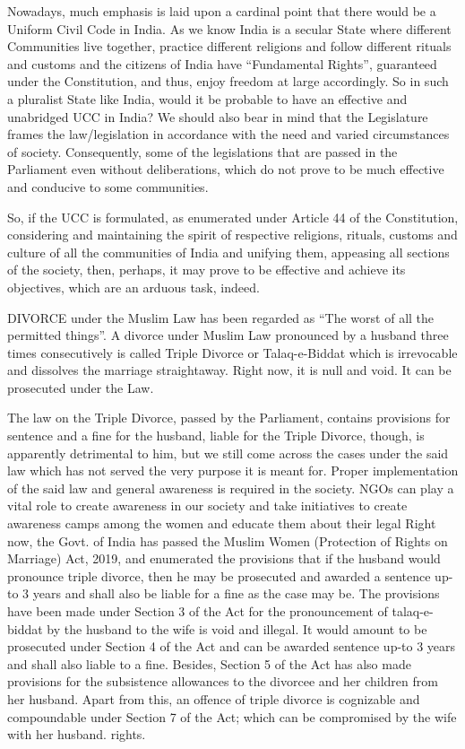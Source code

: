 \begin{multicols}{2}
Nowadays, much emphasis is laid upon a cardinal point that there would be a Uniform Civil
Code in India. As we know India is a secular State where different Communities live
together, practice different religions and follow different rituals and customs and the citizens
of India have “Fundamental Rights”, guaranteed under the Constitution, and thus, enjoy
freedom at large accordingly. So in such a pluralist State like India, would it be probable to
have an effective and unabridged UCC in India? We should also bear in mind that the
Legislature frames the law/legislation in accordance with the need and varied circumstances
of society. Consequently, some of the legislations that are passed in the Parliament even
without deliberations, which do not prove to be much effective and conducive to some
communities.

So, if the UCC is formulated, as enumerated under Article 44 of the Constitution, considering
and maintaining the spirit of respective religions, rituals, customs and culture of all the
communities of India and unifying them, appeasing all sections of the society, then, perhaps,
it may prove to be effective and achieve its objectives, which are an arduous task, indeed. 

DIVORCE under the Muslim Law has been regarded as “The worst of all the permitted
things”. A divorce under Muslim Law pronounced by a husband three times consecutively is
called Triple Divorce or Talaq-e-Biddat which is irrevocable and dissolves the marriage
straightaway. Right now, it is null and void. It can be prosecuted under the Law.

The law on the Triple Divorce, passed by the Parliament, contains provisions for sentence
and a fine for the husband, liable for the Triple Divorce, though, is apparently detrimental to him, but we still come across the cases under the said law which has not served the very
purpose it is meant for. Proper implementation of the said law and general awareness is
required in the society. NGOs can play a vital role to create awareness in our society and take
initiatives to create awareness camps among the women and educate them about their legal Right now, the Govt. of India has passed the Muslim Women (Protection of Rights on
Marriage) Act, 2019, and enumerated the provisions that if the husband would pronounce
triple divorce, then he may be prosecuted and awarded a sentence up-to 3 years and shall also
be liable for a fine as the case may be. The provisions have been made under Section 3 of the
Act for the pronouncement of talaq-e-biddat by the husband to the wife is void and illegal. It
would amount to be prosecuted under Section 4 of the Act and can be awarded sentence up-to
3 years and shall also liable to a fine. Besides, Section 5 of the Act has also made provisions
for the subsistence allowances to the divorcee and her children from her husband. Apart from
this, an offence of triple divorce is cognizable and compoundable under Section 7 of the Act;
which can be compromised by the wife with her husband.
rights. 


\end{multicols}
